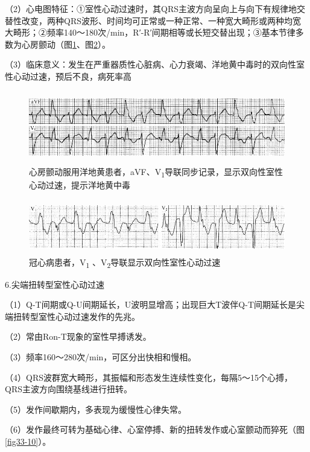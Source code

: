 （2）心电图特征：①室性心动过速时，其QRS主波方向呈向上与向下有规律地交替性改变，两种QRS波形、时间均可正常或一种正常、一种宽大畸形或两种均宽大畸形；②频率140～180次/min，R′-R′间期相等或长短交替出现；③基本节律多数为心房颤动（图\ref{fig33-8}、图\ref{fig33-9}）。

（3）临床意义：发生在严重器质性心脏病、心力衰竭、洋地黄中毒时的双向性室性心动过速，预后不良，病死率高

\begin{figure}[!htbp]
 \centering
 \includegraphics[width=5.58333in,height=1.25in]{./images/Image00537.jpg}
 \captionsetup{justification=centering}
 \caption{心房颤动服用洋地黄患者，aVF、V\textsubscript{1}导联同步记录，显示双向性室性心动过速，提示洋地黄中毒}
 \label{fig33-8}
  \end{figure} 


\begin{figure}[!htbp]
 \centering
 \includegraphics[width=5.58333in,height=0.9375in]{./images/Image00538.jpg}
 \captionsetup{justification=centering}
 \caption{冠心病患者，V\textsubscript{1} 、V\textsubscript{2}导联显示双向性室性心动过速}
 \label{fig33-9}
  \end{figure} 


6.尖端扭转型室性心动过速

（1）Q-T间期或Q-U间期延长，U波明显增高；出现巨大T波伴Q-T间期延长是尖端扭转型室性心动过速发作的先兆。

（2）常由Ron-T现象的室性早搏诱发。

（3）频率160～280次/min，可区分出快相和慢相。

（4）QRS波群宽大畸形，其振幅和形态发生连续性变化，每隔5～15个心搏，QRS主波方向围绕基线进行扭转。

（5）发作间歇期内，多表现为缓慢性心律失常。

（6）发作最终可转为基础心律、心室停搏、新的扭转发作或心室颤动而猝死（图\ref{fig33-10}）。

